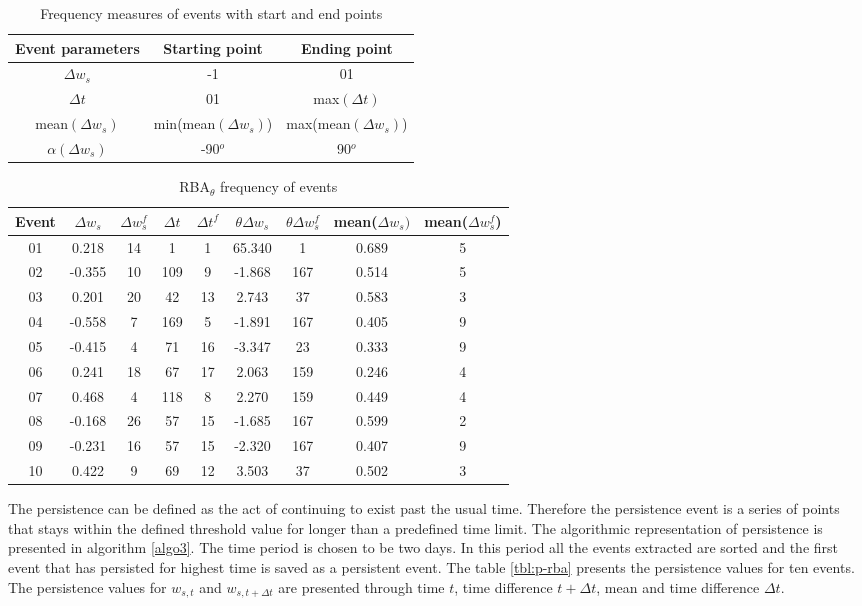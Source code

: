 \begin{table}[!htbp]
\centering
\begin{tabular}{ccc} \hline
Event parameters 	& Starting point & Ending point \\ \hline
$\Delta w_s$ 			& -1 					& 01 					\\
$\Delta t$ 				& 01 					& max$(\Delta t)$ \\
mean$(\Delta w_s)$ & min(mean$(\Delta w_s)$) & max(mean$(\Delta w_s)$) \\
$\alpha (\Delta w_s)$ & -90$^o$ & 90$^o$ \\ \hline
\end{tabular}
\caption{Frequency measures of events with start and end points}
\label{tbl:freq1}
\end{table}



\begin{table}[!htbp]
\centering
\begin{tabular}{ccccccccc} \hline
Event & $\Delta w_s$ &  $\Delta w_s^f$  & $\Delta t$ & $\Delta t^f$ & $\theta \Delta w_s$ & $\theta \Delta w_s^f$ & mean($\Delta w_s)$ & mean($\Delta w_s^f$) \\ \hline
01	&	0.218	&	14	&	1	&	1	&	65.340	&	1	&	0.689	&	5	\\
02	&	-0.355	&	10	&	109	&	9	&	-1.868	&	167	&	0.514	&	5	\\
03	&	0.201	&	20	&	42	&	13	&	2.743	&	37	&	0.583	&	3	\\
04	&	-0.558	&	7	&	169	&	5	&	-1.891	&	167	&	0.405	&	9	\\
05	&	-0.415	&	4	&	71	&	16	&	-3.347	&	23	&	0.333	&	9	\\
06	&	0.241	&	18	&	67	&	17	&	2.063	&	159	&	0.246	&	4	\\
07	&	0.468	&	4	&	118	&	8	&	2.270	&	159	&	0.449	&	4	\\
08	&	-0.168	&	26	&	57	&	15	&	-1.685	&	167	&	0.599	&	2	\\
09	&	-0.231	&	16	&	57	&	15	&	-2.320	&	167	&	0.407	&	9	\\
10	&	0.422	&	9	&	69	&	12	&	3.503	&	37	&	0.502	&	3	\\
\hline
\end{tabular}
\caption{RBA$_\theta$ frequency of events}
\label{tbl:freq2}
\end{table}


The persistence can be defined as the act of continuing to exist past the usual time. Therefore the persistence event is a series of points that stays within the defined threshold value for longer than a predefined time limit. The algorithmic representation of persistence is presented in algorithm \ref{algo3}. The time period is chosen to be two days. In this period all the events extracted are sorted and the first event that has persisted for highest time is saved as a persistent event. The table \ref{tbl:p-rba} presents the persistence values for ten events. The persistence values for $w_{s,t}$ and $w_{s, t+ \Delta t}$ are presented through time $t$, time difference $t+ \Delta t$, mean and time difference $\Delta t$.


